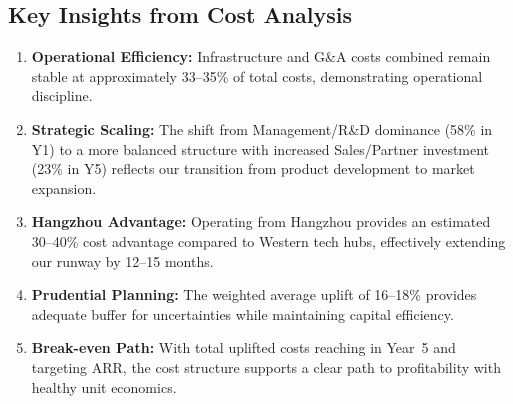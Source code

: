 \begin{table}[H]
\centering
\caption{Infrastructure \& Platform Investment ROI}
\label{tab:infrastructure_roi}
\end{table}

\subsection{Key Insights from Cost Analysis}

\begin{enumerate}
    \item \textbf{Operational Efficiency:} Infrastructure and G\&A costs combined remain stable at approximately 33--35\% of total costs, demonstrating operational discipline.
    
    \item \textbf{Strategic Scaling:} The shift from Management/R\&D dominance (58\% in Y1) to a more balanced structure with increased Sales/Partner investment (23\% in Y5) reflects our transition from product development to market expansion.
    
    \item \textbf{Hangzhou Advantage:} Operating from Hangzhou provides an estimated 30--40\% cost advantage compared to Western tech hubs, effectively extending our runway by 12--15 months.
    
    \item \textbf{Prudential Planning:} The weighted average uplift of 16--18\% provides adequate buffer for uncertainties while maintaining capital efficiency.
    
    \item \textbf{Break-even Path:} With total uplifted costs reaching  in Year~5 and targeting  ARR, the cost structure supports a clear path to profitability with healthy unit economics.
\end{enumerate}


